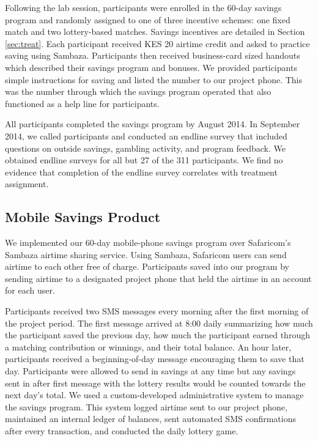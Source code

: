 \documentclass[11pt]{article}
\begin{document}
		Following the lab session, participants were enrolled in the 60-day savings program and randomly assigned to one of three incentive schemes: one fixed match and two lottery-based matches. Savings incentives are detailed in Section \ref{sec:treat}. Each participant received KES 20 airtime credit and asked to practice saving using Sambaza. Participants then received business-card sized handouts which described their savings program and bonuses. We provided participants simple instructions for saving and listed the number to our project phone. This was the number through which the savings program operated that also functioned as a help line for participants.

		All participants completed the savings program by August 2014. In September 2014, we called participants and conducted an endline survey that included questions on outside savings, gambling activity, and program feedback. We obtained endline surveys for all but 27 of the 311 participants. We find no evidence that completion of the endline survey correlates with treatment assignment.

		\clearpage

	\subsection{Mobile Savings Product}

		We implemented our 60-day mobile-phone savings program over Safaricom's Sambaza airtime sharing service. Using Sambaza, Safaricom users can send airtime to each other free of charge. Participants saved into our program by sending airtime to a designated project phone that held the airtime in an account for each user.

		Participants received two SMS messages every morning after the first morning of the project period. The first message arrived at 8:00 daily summarizing how much the participant saved the previous day, how much the participant earned through a matching contribution or winnings, and their total balance. An hour later, participants received a beginning-of-day message encouraging them to save that day. Participants were allowed to send in savings at any time but any savings sent in after first message with the lottery results would be counted towards the next day's total. We used a custom-developed administrative system to manage the savings program. This system logged airtime sent to our project phone, maintained an internal ledger of balances, sent automated SMS confirmations after every transaction, and conducted the daily lottery game.
\end{document}
